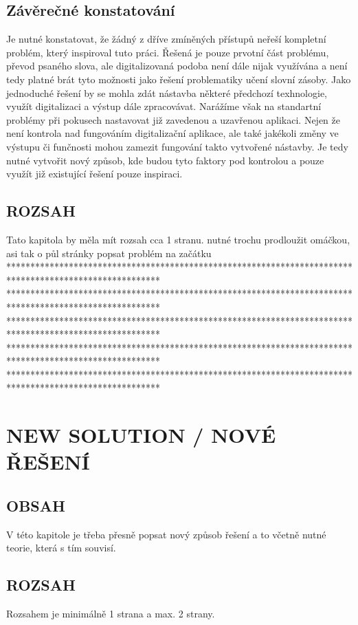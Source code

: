 \documentclass[journal]{IEEEtran}
\begin{document}
\subsection{Závěrečné konstatování}
Je nutné konstatovat, že žádný z dříve zmíněných přístupů neřeší  kompletní problém, který inspiroval tuto práci. Řešená je pouze  prvotní část problému, převod psaného slova, ale digitalizovaná podoba není dále nijak využívána a není tedy platné brát tyto možnosti jako řešení problematiky učení slovní zásoby.
Jako jednoduché řešení by se mohla zdát nástavba některé předchozí texhnologie, využít digitalizaci a výstup dále zpracovávat. Narážíme však na standartní problémy při pokusech nastavovat již zavedenou a uzavřenou aplikaci. Nejen že není  kontrola nad fungováním digitalizační aplikace, ale také jakékoli změny ve výstupu či funčnosti mohou zamezit fungování takto vytvořené nástavby.
Je tedy nutné vytvořit nový způsob, kde budou tyto faktory pod kontrolou a pouze využít již existující řešení pouze inspiraci.


\subsection{ROZSAH}
Tato kapitola by měla mít rozsah cca 1 stranu.
nutné trochu prodloužit omáčkou, asi tak o půl stránky
popsat problém na začátku
********************************************************************************************************
********************************************************************************************************
********************************************************************************************************
********************************************************************************************************
********************************************************************************************************



\section{NEW SOLUTION / NOVÉ ŘEŠENÍ}

\subsection{OBSAH}
V této kapitole je třeba přesně popsat nový způsob řešení a to včetně nutné teorie, která s tím souvisí. 
\subsection{ROZSAH}
Rozsahem je minimálně 1 strana a max. 2 strany.
\end{document}

